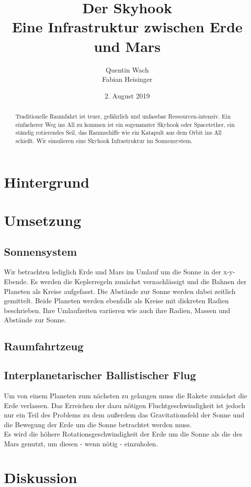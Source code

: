 \documentclass{article}
\title{ \textbf{Der Skyhook} \\ \textmd{Eine Infrastruktur zwischen Erde und Mars}}  %
\author{
  Quentin Wach \\
  Fabian Heisinger
  \date{2. August 2019}
}
\begin{document}
\maketitle
\begin{abstract}
Traditionelle Raumfahrt ist teuer, gefährlich und unfassbar Ressourcen-intensiv. Ein einfacherer Weg  ins All zu kommen ist ein sogenannter Skyhook oder Spacetether,  ein ständig rotierendes Seil, das Raumschiffe wie ein Katapult aus dem Orbit ins All schießt. Wir simulieren eine Skyhook Infrastruktur im Sonnensystem.
\end{abstract}

\section{Hintergrund}

\section{Umsetzung}
\subsection{Sonnensystem}
Wir betrachten lediglich Erde und Mars im Umlauf um die Sonne in der x-y-Ebende. Es werden die Keplerregeln zunächst vernachlässigt und die Bahnen der Planeten als Kreise aufgefasst. Die Abstände zur Sonne werden dabei zeitlich gemittelt. Beide Planeten werden ebenfalls als Kreise mit diskreten Radien beschrieben. Ihre Umlaufzeiten variieren wie auch ihre Radien, Massen und Abstände zur Sonne.  
\subsection{Raumfahrtzeug}
\subsection{Interplanetarischer Ballistischer Flug}
Um von einem Planeten zum nächsten zu gelangen muss die Rakete zunächst die Erde verlassen. Das Erreichen der dazu nötigen Fluchtgeschwindigkeit ist jedoch nur ein Teil des Problems zu dem außerdem das Gravitationsfeld der Sonne und die Bewegung der Erde um die Sonne betrachtet werden muss. \\

Es wird die höhere Rotationsgeschwindigkeit der Erde um die Sonne als die des Mars genutzt, um diesen - wenn nötig - einzuholen.
\section{Diskussion}
\end{document}

